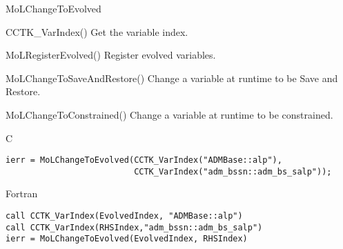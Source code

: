 \begin{FunctionDescription}{MoLChangeToEvolved}
  \begin{SeeAlsoSection}
    \begin{SeeAlso}{CCTK\_VarIndex()}
      Get the variable index.
    \end{SeeAlso}
    \begin{SeeAlso}{MoLRegisterEvolved()}
      Register evolved variables.
    \end{SeeAlso}
    \begin{SeeAlso}{MoLChangeToSaveAndRestore()}
      Change a variable at runtime to be Save and Restore.
    \end{SeeAlso}
    \begin{SeeAlso}{MoLChangeToConstrained()}
      Change a variable at runtime to be constrained.
    \end{SeeAlso}
  \end{SeeAlsoSection}

  \begin{ExampleSection}
    \begin{Example}{C}
\begin{verbatim}
ierr = MoLChangeToEvolved(CCTK_VarIndex("ADMBase::alp"),
                          CCTK_VarIndex("adm_bssn::adm_bs_salp"));
\end{verbatim}
    \end{Example}
    \begin{Example}{Fortran}
\begin{verbatim}
call CCTK_VarIndex(EvolvedIndex, "ADMBase::alp")
call CCTK_VarIndex(RHSIndex,"adm_bssn::adm_bs_salp")
ierr = MoLChangeToEvolved(EvolvedIndex, RHSIndex)
\end{verbatim}
    \end{Example}
  \end{ExampleSection}

\end{FunctionDescription}



